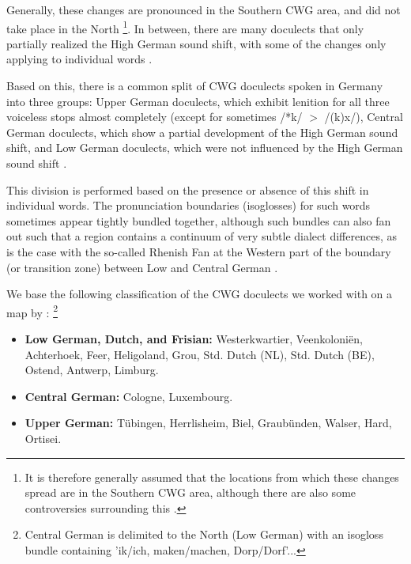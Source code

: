 \documentclass[a4paper]{article}
\begin{document}
Generally, these changes are pronounced
in the Southern CWG area, and did not take place in the North
\cite[p. 33]{noble1983modern}
\footnote{
It is therefore generally assumed that the locations
from which these changes spread are in the Southern CWG area,
although there are also some controversies surrounding this
\citep[pp. 155--181]{goblirsch2005lautverschiebungen}.
}.
In between, there are many doculects
that only partially realized the High German sound shift,
with some of the changes only applying to individual words
\citet[p. 63]{koenig2015dtv}.

Based on this, there is a common split
of CWG doculects spoken in Germany into three groups:
Upper German doculects, which exhibit lenition for
all three voiceless stops almost completely
(except for sometimes /*k/ $>$ /(k)x/),
Central German doculects, which show a
partial development of the High German sound shift,
and Low German doculects,
which were not influenced by the High German sound shift
\citep[pp. 33, 55]{noble1983modern}.

This division is performed based on
the presence or absence of this shift in individual words.
The pronunciation boundaries (isoglosses) for such words
sometimes appear tightly bundled together,
although such bundles can also fan out such that a region
contains a continuum of very subtle dialect differences,
as is the case with the so-called Rhenish Fan at the Western part
of the boundary (or transition zone) between Low and Central German
\citep[pp. 63, 138, 141]{koenig2015dtv}.

We base the following classification of
the CWG doculects we worked with
on a map by \citet[pp. 230-231]{koenig2015dtv}:
\footnote{
Central German is delimited %
to the North (Low German) with an isogloss bundle containing
'ik/ich, maken/machen, Dorp/Dorf'...
}

\begin{itemize}
\item
\textbf{Low German, Dutch, and Frisian:}
Westerkwartier, Veenkoloni\"{e}n, Achterhoek,
Feer, Heligoland, Grou,
Std. Dutch (NL), Std. Dutch (BE), Ostend, Antwerp, Limburg.

\item
\textbf{Central German:}
Cologne, Luxembourg.

\item
\textbf{Upper German:}
T\"{u}bingen, Herrlisheim,
Biel, Graub\"{u}nden, Walser, Hard, Ortisei.
\end{itemize}
\end{document}
